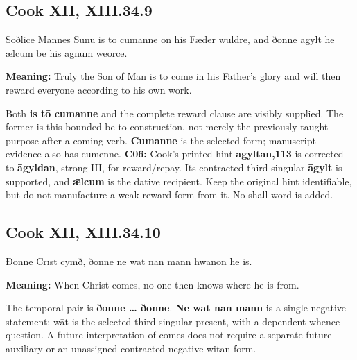 \par\begin{minipage}{\linewidth}\raggedright
\subsection*{Cook XII, XIII.34.9}

Sōðlice Mannes Sunu is tō cumanne on his Fæder wuldre, and ðonne āgylt hē ǣlcum be his āgnum weorce.

\textbf{Meaning:} Truly the Son of Man is to come in his Father’s glory and will then reward everyone according to his own work.

Both \textbf{is tō cumanne} and the complete reward clause are visibly supplied. The former is this bounded be-to construction, not merely the previously taught purpose after a coming verb. \textbf{Cumanne} is the selected form; manuscript evidence also has cumenne. \textbf{C06:} Cook’s printed hint \textbf{āgyltan,113} is corrected to \textbf{āgyldan}, strong III, for reward/\allowbreak{}repay. Its contracted third singular \textbf{āgylt} is supported, and \textbf{ǣlcum} is the dative recipient. Keep the original hint identifiable, but do not manufacture a weak reward form from it. No shall word is added.

\end{minipage}\par\addvspace{4pt}

\par\begin{minipage}{\linewidth}\raggedright
\subsection*{Cook XII, XIII.34.10}

Ðonne Crīst cymð, ðonne ne wāt nān mann hwanon hē is.

\textbf{Meaning:} When Christ comes, no one then knows where he is from.

The temporal pair is \textbf{ðonne … ðonne}. \textbf{Ne wāt nān mann} is a single negative statement; wāt is the selected third-singular present, with a dependent whence-question. A future interpretation of comes does not require a separate future auxiliary or an unassigned contracted negative-witan form.

\end{minipage}\par\addvspace{4pt}

